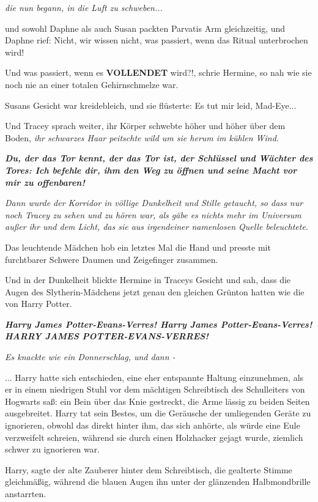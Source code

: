 \emph{die nun begann, in die Luft zu schweben...}

und sowohl Daphne als auch Susan packten Parvatis Arm gleichzeitig, und Daphne
rief: \glqq{}Nicht, wir wissen nicht, was passiert, wenn das Ritual unterbrochen
wird!\grqq{}

\glqq{}Und was passiert, wenn es \textbf{VOLLENDET} wird?!\grqq{}, schrie
Hermine, so nah wie sie noch nie an einer totalen Gehirnschmelze war.

Susans Gesicht war kreidebleich, und sie flüsterte: \glqq{}Es tut mir leid,
Mad-Eye...\grqq{}

Und Tracey sprach weiter, ihr Körper schwebte höher und höher über dem
Boden,\emph{ ihr schwarzes Haar peitschte wild um sie herum im kühlen Wind.}

\glqq{}\textbf{\emph{Du, der das Tor kennt, der das Tor ist, der Schlüssel und
Wächter des Tores: Ich befehle dir, ihm den Weg zu öffnen und seine Macht vor
mir zu offenbaren!}}\grqq{}

\emph{Dann wurde der Korridor in völlige Dunkelheit und Stille getaucht, so dass
nur noch Tracey zu sehen und zu hören war, als gäbe es nichts mehr im Universum
außer ihr und dem Licht, das sie aus irgendeiner namenlosen Quelle beleuchtete}.

Das leuchtende Mädchen hob ein letztes Mal die Hand und presste mit furchtbarer
Schwere Daumen und Zeigefinger zusammen.

Und in der Dunkelheit blickte Hermine in Traceys Gesicht und sah, dass die Augen
des Slytherin-Mädchens jetzt genau den gleichen Grünton hatten wie die von Harry
Potter.

\glqq{}\textbf{\emph{Harry James Potter-Evans-Verres! Harry James
Potter-Evans-Verres! HARRY JAMES POTTER-EVANS-VERRES!}}\grqq{}

\emph{Es knackte wie ein Donnerschlag,
und dann -}

... Harry hatte sich entschieden, eine eher entspannte Haltung einzunehmen, als
er in einem niedrigen Stuhl vor dem mächtigen Schreibtisch des Schulleiters von
Hogwarts saß: ein Bein über das Knie gestreckt, die Arme lässig zu beiden Seiten
ausgebreitet. Harry tat sein Bestes, um die Geräusche der umliegenden Geräte zu
ignorieren, obwohl das direkt hinter ihm, das sich anhörte, als würde eine Eule
verzweifelt schreien, während sie durch einen Holzhacker gejagt wurde, ziemlich
schwer zu ignorieren war.

\glqq{}Harry\grqq{}, sagte der alte Zauberer hinter dem Schreibtisch, die
gealterte Stimme gleichmäßig, während die blauen Augen ihn unter der glänzenden
Halbmondbrille anstarrten.

